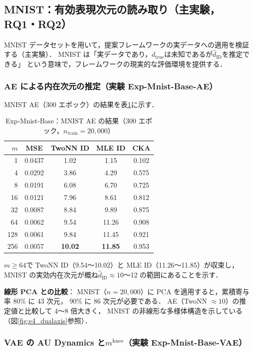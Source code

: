 \documentclass[11pt,a4paper]{jsarticle}
\newcommand{\dtrue}{d_{\mathrm{true}}}
\newcommand{\mknee}{m^{\mathrm{knee}}}
\begin{document}
\subsection{MNIST：有効表現次元の読み取り（主実験，RQ1・RQ2）}\label{sec:exp_mnist}

MNIST データセットを用いて，提案フレームワークの実データへの適用を検証する（主実験）．
MNIST は「実データであり，$\dtrue$は未知であるが$\hat{d}_\mathrm{ID}$を推定できる」
という意味で，フレームワークの現実的な評価環境を提供する．

\subsubsection{AE による内在次元の推定（実験 Exp-Mnist-Base-AE）}

MNIST AE（300 エポック）の結果を表\ref{tab:e4_ae}に示す．

\begin{table}[H]
\centering
\caption{Exp-Mnist-Base：MNIST AE の結果（300 エポック，$n_{\mathrm{train}}=20{,}000$）}
\label{tab:e4_ae}
\small
\begin{tabular}{rcccc}
\toprule
$m$ & MSE & TwoNN ID & MLE ID & CKA \\
\midrule
1   & 0.0437 & 1.02  & 1.15  & 0.102 \\
4   & 0.0292 & 3.86  & 4.29  & 0.575 \\
8   & 0.0191 & 6.08  & 6.70  & 0.725 \\
16  & 0.0121 & 7.96  & 8.61  & 0.812 \\
32  & 0.0087 & 8.84  & 9.89  & 0.875 \\
64  & 0.0062 & 9.54  & 11.26 & 0.908 \\
128 & 0.0061 & 9.84  & 11.45 & 0.921 \\
256 & 0.0057 & \textbf{10.02} & \textbf{11.85} & 0.953 \\
\bottomrule
\end{tabular}
\end{table}

$m \geq 64$で TwoNN ID（9.54〜10.02）と MLE ID（11.26〜11.85）が収束し，
MNIST の実効内在次元が概ね$\hat{d}_\mathrm{ID} \approx 10$〜12 の範囲にあることを示す．

\textbf{線形 PCA との比較}：
MNIST（$n = 20{,}000$）に PCA を適用すると，累積寄与率 80\% に 43 次元，
90\% に 86 次元が必要である．
AE（TwoNN $\approx 10$）の推定値と比較して 4〜8 倍大きく，
MNIST の非線形な多様体構造を示している（図\ref{fig:e4_dualaxis}参照）．

\subsubsection{VAE の AU Dynamics と$\mknee$（実験 Exp-Mnist-Base-VAE）}
\end{document}
